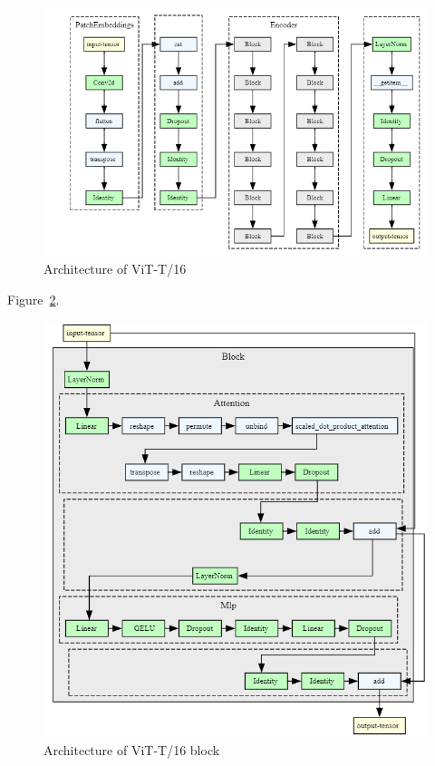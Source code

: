 \begin{figure}[H]
    \begin{center}
    \includegraphics[width=15cm]{../images/vit_t16_architecture.png}
    \caption{Architecture of ViT-T/16}\label{fig:vit_t16_architecture}
    \end{center}
\end{figure}

Figure~\ref{fig:vit_t16_architecture_block}.

\begin{figure}[H]
    \begin{center}
    \includegraphics[width=15cm]{../images/vit_t16_architecture_block.png}
    \caption{Architecture of ViT-T/16 block}\label{fig:vit_t16_architecture_block}
    \end{center}
\end{figure}



